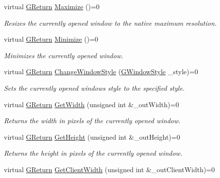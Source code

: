 \begin{DoxyCompactItemize}
virtual \hyperlink{namespaceGW_a67a839e3df7ea8a5c5686613a7a3de21}{G\+Return} \hyperlink{classGW_1_1SYSTEM_1_1GWindow_a06b5f092e742baca82a0bfc2cbaef153}{Maximize} ()=0
\begin{DoxyCompactList}\small\item\em Resizes the currently opened window to the native maximum resolution. \end{DoxyCompactList}\item 
virtual \hyperlink{namespaceGW_a67a839e3df7ea8a5c5686613a7a3de21}{G\+Return} \hyperlink{classGW_1_1SYSTEM_1_1GWindow_a2cced61a323dac10535904c3899563d8}{Minimize} ()=0
\begin{DoxyCompactList}\small\item\em Minimizes the currently opened window. \end{DoxyCompactList}\item 
virtual \hyperlink{namespaceGW_a67a839e3df7ea8a5c5686613a7a3de21}{G\+Return} \hyperlink{classGW_1_1SYSTEM_1_1GWindow_a21533c58e920d347c377ebdaa6d2b76f}{Change\+Window\+Style} (\hyperlink{namespaceGW_1_1SYSTEM_ad117891e556631f842625c348d36a071}{G\+Window\+Style} \+\_\+style)=0
\begin{DoxyCompactList}\small\item\em Sets the currently opened window\textquotesingle{}s style to the specified style. \end{DoxyCompactList}\item 
virtual \hyperlink{namespaceGW_a67a839e3df7ea8a5c5686613a7a3de21}{G\+Return} \hyperlink{classGW_1_1SYSTEM_1_1GWindow_a75672fb359ee44c5e551ee6223a10bdb}{Get\+Width} (unsigned int \&\+\_\+out\+Width)=0
\begin{DoxyCompactList}\small\item\em Returns the width in pixels of the currently opened window. \end{DoxyCompactList}\item 
virtual \hyperlink{namespaceGW_a67a839e3df7ea8a5c5686613a7a3de21}{G\+Return} \hyperlink{classGW_1_1SYSTEM_1_1GWindow_aab8f7e74d8554f309a7785216ff89ff3}{Get\+Height} (unsigned int \&\+\_\+out\+Height)=0
\begin{DoxyCompactList}\small\item\em Returns the height in pixels of the currently opened window. \end{DoxyCompactList}\item 
virtual \hyperlink{namespaceGW_a67a839e3df7ea8a5c5686613a7a3de21}{G\+Return} \hyperlink{classGW_1_1SYSTEM_1_1GWindow_a6cedaf7ca08ed3519092196a8ae79784}{Get\+Client\+Width} (unsigned int \&\+\_\+out\+Client\+Width)=0

\end{DoxyCompactItemize}
